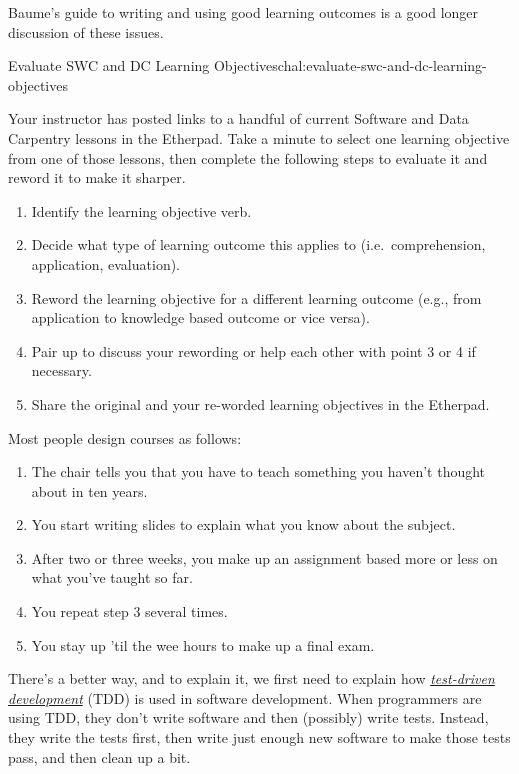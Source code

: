 Baume's guide to
writing and using good learning outcomes \cite{bib:baume-fixme} is a good longer discussion of these
issues.

\begin{challenge}{Evaluate SWC and DC Learning Objectives}{chal:evaluate-swc-and-dc-learning-objectives}

Your instructor has posted links to a handful of current Software and
Data Carpentry lessons in the Etherpad. Take a minute to select one
learning objective from one of those lessons, then complete the
following steps to evaluate it and reword it to make it sharper.

\begin{enumerate}
\item
  Identify the learning objective verb.
\item
  Decide what type of learning outcome this applies to
  (i.e.~comprehension, application, evaluation).
\item
  Reword the learning objective for a different learning outcome (e.g.,
  from application to knowledge based outcome or vice versa).
\item
  Pair up to discuss your rewording or help each other with point 3 or 4
  if necessary.
\item
  Share the original and your re-worded learning objectives in the Etherpad.
\end{enumerate}
\end{challenge}


Most people design courses as follows:

\begin{enumerate}
\item
  The chair tells you that you have to teach something you haven't
  thought about in ten years.
\item
  You start writing slides to explain what you know about the subject.
\item
  After two or three weeks, you make up an assignment based more or less
  on what you've taught so far.
\item
  You repeat step 3 several times.
\item
  You stay up 'til the wee hours to make up a final exam.
\end{enumerate}

There's a better way, and to explain it, we first need to explain how
\emph{\href{https://en.wikipedia.org/wiki/Test-driven\_development}{test-driven
development}} (TDD) is used in software development. When programmers
are using TDD, they don't write software and then (possibly) write
tests. Instead, they write the tests first, then write just enough new
software to make those tests pass, and then clean up a bit.

